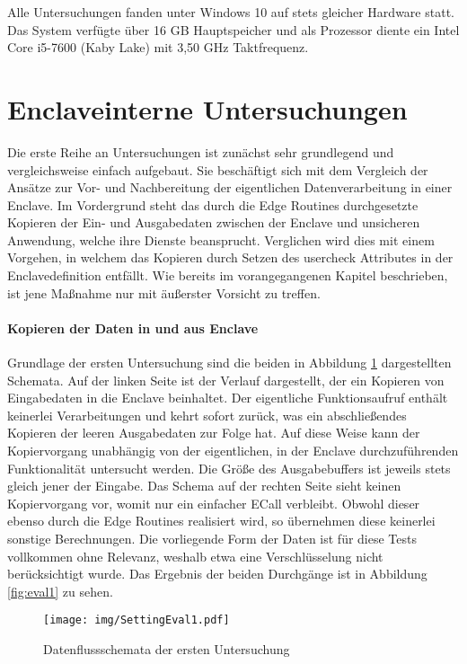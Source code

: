 Alle Untersuchungen fanden unter Windows 10 auf stets gleicher Hardware statt. Das System verfügte über 16 GB Hauptspeicher und als Prozessor diente ein Intel Core i5-7600 (Kaby Lake) mit 3,50 GHz Taktfrequenz.

\section{Enclaveinterne Untersuchungen}

Die erste Reihe an Untersuchungen ist zunächst sehr grundlegend und vergleichsweise einfach aufgebaut. Sie beschäftigt sich mit dem Vergleich der Ansätze zur Vor- und Nachbereitung der eigentlichen Datenverarbeitung in einer Enclave. Im Vordergrund steht das durch die Edge Routines durchgesetzte Kopieren der Ein- und Ausgabedaten zwischen der Enclave und unsicheren Anwendung, welche ihre Dienste beansprucht. Verglichen wird dies mit einem Vorgehen, in welchem das Kopieren durch Setzen des user\textunderscore check Attributes in der Enclavedefinition entfällt. Wie bereits im vorangegangenen Kapitel beschrieben, ist jene Maßnahme nur mit äußerster Vorsicht zu treffen.

\paragraph{Kopieren der Daten in und aus Enclave}

Grundlage der ersten Untersuchung sind die beiden in Abbildung \ref{fig:settingeval1} dargestellten Schemata. Auf der linken Seite ist der Verlauf dargestellt, der ein Kopieren von Eingabedaten in die Enclave beinhaltet. Der eigentliche Funktionsaufruf enthält keinerlei Verarbeitungen und kehrt sofort zurück, was ein abschließendes Kopieren der leeren Ausgabedaten zur Folge hat. Auf diese Weise kann der Kopiervorgang unabhängig von der eigentlichen, in der Enclave durchzuführenden Funktionalität untersucht werden. Die Größe des Ausgabebuffers ist jeweils stets gleich jener der Eingabe. Das Schema auf der rechten Seite sieht keinen Kopiervorgang vor, womit nur ein einfacher \ac{ECall} verbleibt. Obwohl dieser ebenso durch die Edge Routines realisiert wird, so übernehmen diese keinerlei sonstige Berechnungen. Die vorliegende Form der Daten ist für diese Tests vollkommen ohne Relevanz, weshalb etwa eine Verschlüsselung nicht berücksichtigt wurde. Das Ergebnis der beiden Durchgänge ist in Abbildung \ref{fig:eval1} zu sehen.

\begin{figure}[h]
	\texttt{[image: img/SettingEval1.pdf]}
	\centering
	\caption{Datenflussschemata der ersten Untersuchung}
	\label{fig:settingeval1}
\end{figure}

